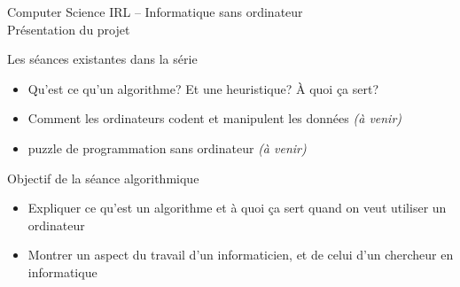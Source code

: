 \documentclass[final,hyperref={pdfpagelabels=false}]{beamer}
\renewenvironment{Coupe}{   }{   }
\renewcommand*{\large}{\fontsize{\resultlargeX}{\resultlargeY}\selectfont}
\begin{document}
\begin{Coupe}
\begin{frame}{Computer Science IRL -- Informatique sans ordinateur\\[-5pt]
  {\large Présentation du projet}}
  \begin{block}{Les séances existantes dans la série}
    \begin{itemize}
    \item {} Qu'est ce qu'un algorithme? Et une
      heuristique? À quoi ça sert?
    \item {} Comment les ordinateurs codent
      et manipulent les données \textit{(à venir)}
    \item {} puzzle de programmation sans ordinateur 
      \textit{(à venir)}
    \end{itemize}
  \end{block}
  \vspace{2\baselineskip}

  \begin{block}{Objectif de la séance algorithmique}
    \begin{itemize}
    \item Expliquer ce qu'est un algorithme et à quoi ça sert quand on veut
      utiliser un ordinateur
    \item Montrer un aspect du travail d'un informaticien, et de celui d'un
      chercheur en informatique
    \end{itemize}
  \end{block}


\end{frame}
\end{Coupe}
\end{document}
